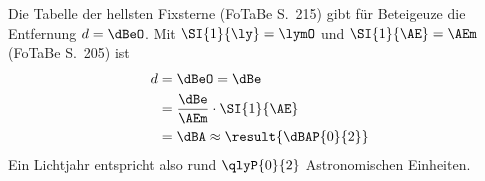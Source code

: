 Die Tabelle der hellsten Fixsterne (FoTaBe S.~215) gibt für Beteigeuze die Entfernung $d = \dBeO$. Mit $\SI{1}{\ly} = \lymO$ und $\SI{1}{\AE} = \AEm$ (FoTaBe S.~205) ist
\begin{align}
 d &= \dBeO = \dBe \\
   &= \frac{\dBe}{\AEm}\cdot\SI{1}{\AE} \\
   &= \dBA \approx \result{\dBAP{0}{2}}
\end{align}
Ein Lichtjahr entspricht also rund $\qlyP{0}{2}$ Astronomischen Einheiten.
